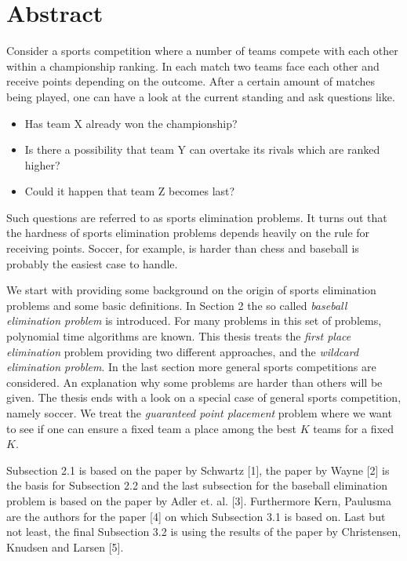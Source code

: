 \chapter*{Abstract}
\label{cha:abstract}

Consider a sports competition where a number of teams compete with each other within a championship ranking. In each match two teams face each other and receive points depending on the outcome. After a certain amount of matches being played, one can have a look at the current standing and ask questions like.
\begin{itemize}
\item Has team X already won the championship? 
\item Is there a possibility that team Y can overtake its rivals which are ranked higher? 
\item Could it happen that team Z becomes last? 
\end{itemize}

Such questions are referred to as sports elimination problems. It turns out that the hardness of sports elimination problems depends heavily on the rule for receiving points. Soccer, for example, is harder than chess and baseball is probably the easiest case to handle.

We start with providing some background on the origin of sports elimination problems and some basic definitions. In Section 2 the so called \textit{baseball elimination problem} is introduced. For many problems in this set of problems, polynomial time algorithms are known. This thesis treats the \textit{first place elimination} problem providing two different approaches, and the \textit{wildcard elimination problem}. In the last section more general sports competitions are considered. An explanation why some problems are harder than others will be given. The thesis ends with a look on a special case of general sports competition, namely soccer. We treat the \textit{guaranteed point placement} problem where we want to see if one can ensure a fixed team a place among the best $K$ teams for a fixed $K$. 

Subsection 2.1 is based on the paper by Schwartz [1], the paper by Wayne [2] is the basis for Subsection 2.2 and the last subsection for the baseball elimination problem is based on the paper by Adler et. al. [3]. Furthermore Kern, Paulusma are the authors for the paper [4] on which Subsection 3.1 is based on. Last but not least, the final Subsection 3.2 is using the  results of the paper by Christensen, Knudsen and Larsen [5].